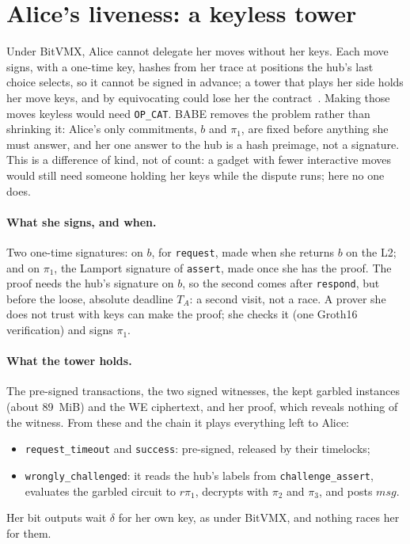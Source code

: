 \documentclass[11pt]{article}
\newcommand{\tx}[1]{\texttt{#1}}
\begin{document}
\section{Alice's liveness: a keyless tower}
\label{sec:tower}

Under BitVMX, Alice cannot delegate her moves without her keys. Each move
signs, with a one-time key, hashes from her trace at positions the hub's
last choice selects, so it cannot be signed in advance; a tower that
plays her side holds her move keys, and by equivocating could lose her
the contract~\cite[\S 10]{lichenbitvmx}. Making those moves keyless would
need \texttt{OP\_CAT}. BABE removes the problem rather than shrinking
it: Alice's only commitments, $b$ and $\pi_1$, are fixed before anything
she must answer, and her one answer to the hub is a hash preimage, not a
signature. This is a difference of kind, not of count: a gadget with
fewer interactive moves would still need someone holding her keys while
the dispute runs; here no one does.

\paragraph{What she signs, and when.} Two one-time signatures: on $b$,
for \tx{request}, made when she returns $b$ on the L2; and on $\pi_1$,
the Lamport signature of \tx{assert}, made once she has the proof. The
proof needs the hub's signature on $b$, so the second comes after
\tx{respond}, but before the loose, absolute deadline $T_A$: a second
visit, not a race. A prover she does not trust with keys can make the
proof; she checks it (one Groth16 verification) and signs $\pi_1$.

\paragraph{What the tower holds.} The pre-signed transactions, the two
signed witnesses, the kept garbled instances (about 89~MiB) and the WE
ciphertext, and her proof, which reveals nothing of the witness. From
these and the chain it plays everything left to Alice:
\begin{itemize}[leftmargin=1.5em]
\item \tx{request\_timeout} and \tx{success}: pre-signed, released by
  their timelocks;
\item \tx{wrongly\_challenged}: it reads the hub's labels from
  \tx{challenge\_assert}, evaluates the garbled circuit to $r\pi_1$,
  decrypts with $\pi_2$ and $\pi_3$, and posts $\mathit{msg}$.
\end{itemize}
Her bit outputs wait $\delta$ for her own key, as under BitVMX, and
nothing races her for them.
\end{document}
